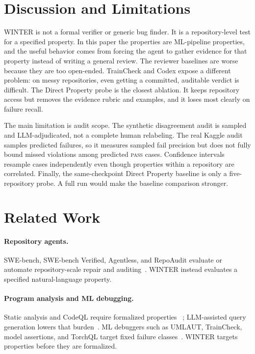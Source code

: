 \documentclass[11pt]{article}
\newcommand{\pass}{\textsc{pass}}
\newcommand{\vibetest}{\textsc{WINTER}}
\begin{document}
\section{Discussion and Limitations}
\label{sec:discussion}

\vibetest{} is not a formal verifier or generic bug finder.
It is a repository-level test for a specified property.
In this paper the properties are ML-pipeline properties, and the useful behavior
comes from forcing the agent to gather evidence for that property instead of
writing a general review.
The reviewer baselines are worse because they are too open-ended.
TrainCheck and Codex expose a different problem: on messy repositories, even
getting a committed, auditable verdict is difficult.
The Direct Property probe is the closest ablation.
It keeps repository access but removes the evidence rubric and examples, and it
loses most clearly on failure recall.

The main limitation is audit scope.
The synthetic disagreement audit is sampled and LLM-adjudicated, not a complete
human relabeling.
The real Kaggle audit samples predicted failures, so it measures sampled fail
precision but does not fully bound missed violations among predicted
\pass{} cases.
Confidence intervals resample cases independently even though properties within
a repository are correlated.
Finally, the same-checkpoint Direct Property baseline is only a five-repository
probe.
A full run would make the baseline comparison stronger.

\section{Related Work}

\paragraph{Repository agents.}
SWE-bench, SWE-bench Verified, Agentless, and RepoAudit evaluate or automate
repository-scale repair and auditing~\citep{jimenez2024swebench,
swebench-verified,xia2024agentless,guo2025repoaudit}.
\vibetest{} instead evaluates a specified natural-language property.

\paragraph{Program analysis and ML debugging.}
Static analysis and CodeQL require formalized properties
~\citep{cousot1979systematic,nielson1999principles,codeql}; LLM-assisted query
generation lowers that burden~\citep{li2024iris,wang2025qlcoder,yang2025knighter}.
ML debuggers such as UMLAUT, TrainCheck, model assertions, and TorchQL target
fixed failure classes~\citep{schoop2021umlaut,traincheck,kang2020assertions,
naik2024torchql}.
\vibetest{} targets properties before they are formalized.
\end{document}
